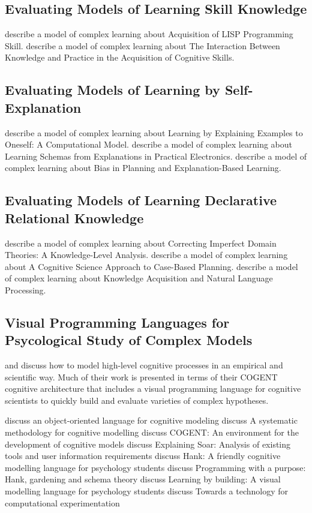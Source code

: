 \subsection{Evaluating Models of Learning Skill Knowledge}
\cite{anderson:1993} describe a model of complex learning about Acquisition of LISP Programming Skill.
\cite{ohlsson:1993} describe a model of complex learning about The Interaction Between Knowledge and Practice in the Acquisition of Cognitive Skills.

\subsection{Evaluating Models of Learning by Self-Explanation}
\cite{vanlehn:1993} describe a model of complex learning about Learning by Explaining Examples to Oneself: A Computational Model.
\cite{kieras:1993} describe a model of complex learning about Learning Schemas from Explanations in Practical Electronics.
\cite{rosenbloom:1993} describe a model of complex learning about Bias in Planning and Explanation-Based Learning.

\subsection{Evaluating Models of Learning Declarative Relational Knowledge}
\cite{huffman:1993} describe a model of complex learning about Correcting Imperfect Domain Theories: A Knowledge-Level Analysis.
\cite{hammond:1993} describe a model of complex learning about A Cognitive Science Approach to Case-Based Planning.
\cite{wilensky:1993} describe a model of complex learning about Knowledge Acquisition and Natural Language Processing.

\subsection{Visual Programming Languages for Psycological Study of Complex Models}

\cite{cooper:2002} and \cite{cooper:1998a} discuss how to model high-level cognitive processes in an empirical and scientific way.
Much of their work is presented in terms of their COGENT cognitive architecture that includes a visual programming language for cognitive scientists to quickly build and evaluate varieties of complex hypotheses.

\cite{cooper:1995} discuss an object-oriented language for cognitive modeling
\cite{cooper:1996} discuss A systematic methodology for cognitive modelling
\cite{cooper:1998b} discuss COGENT: An environment for the development of cognitive models
\cite{councill:2003} discuss Explaining Soar: Analysis of existing tools and user information requirements
\cite{mulholland:1998} discuss Hank: A friendly cognitive modelling language for psychology students
\cite{mulholland:1999} discuss Programming with a purpose: Hank, gardening and schema theory
\cite{mulholland:2000} discuss Learning by building: A visual modelling language for psychology students
\cite{yule:2001} discuss Towards a technology for computational experimentation


